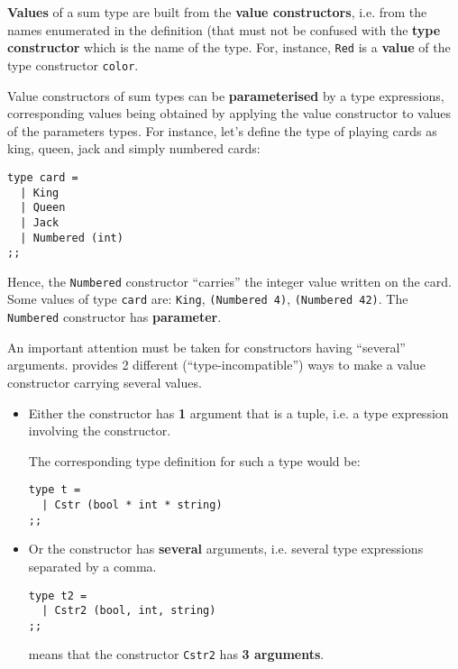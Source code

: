 {\bf Values} of a sum type  are built from the
{\bf value constructors}, i.e. from the names enumerated in the
definition (that must not be confused with the {\bf type constructor}
which is the name of the type. For, instance,
{\tt Red} is a {\bf value} of the type constructor {\tt color}.


Value constructors of sum
types can be {\bf parameterised} by a type expressions, corresponding
values being obtained by applying the value constructor to values of
the parameters types. For instance, let's define the type of playing
cards as king, queen, jack and simply numbered cards:

{\scriptsize
\begin{lstlisting}
type card =
  | King
  | Queen
  | Jack
  | Numbered (int)
;;
\end{lstlisting}
} Hence, the {\tt Numbered} constructor ``carries'' the integer value
written on the card. Some values of type {\tt card} are: {\tt King},
{\tt (Numbered 4)}, {\tt (Numbered 42)}. The {\tt Numbered}
constructor has {\bf parameter}.

\medskip
An important attention must be taken for constructors having
``several'' arguments. \focalize %
provides 2 different
(``type-incompatible'') ways to make a value constructor carrying
several values.
\begin{itemize}
\item Either the constructor has {\bf 1} argument that is a tuple,
  i.e. a type expression involving the {\tt *} constructor.

  The corresponding type definition for such a type would be:
{\scriptsize
\begin{lstlisting}
type t =
  | Cstr (bool * int * string)
;;
\end{lstlisting}
}

\item Or the constructor has {\bf several} arguments, i.e. several
  type expressions separated by a comma.
{\scriptsize
\begin{lstlisting}
type t2 =
  | Cstr2 (bool, int, string)
;;
\end{lstlisting}
}
means that the constructor {\tt Cstr2} has {\bf 3 arguments}.
\end{itemize}


